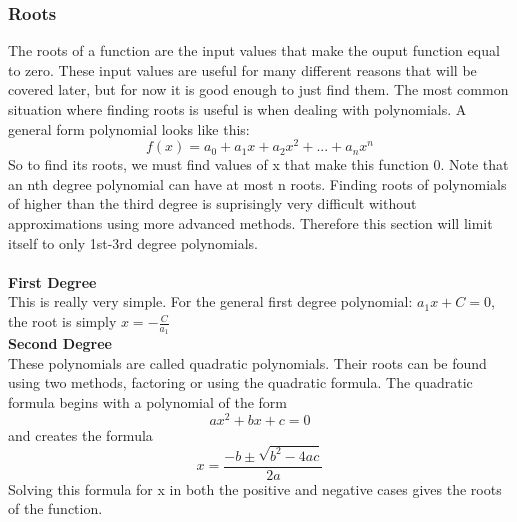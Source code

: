 \documentclass[../Math_Notes.tex]{subfiles}
\begin{document}
\subsubsection{Roots}
The roots of a function are the input values that make the ouput function equal to zero. These input values are useful for many different reasons that will be covered later, but for now it is good enough to just find them. The most common situation where finding roots is useful is when dealing with polynomials. A general form polynomial looks like this:
\[f(x) = a_{0}+a_{1}x+a_{2}x^{2}+...+a_{n}x^{n}\]
So to find its roots, we must find values of x that make this function 0. Note that an nth degree polynomial can have at most n roots. Finding roots of polynomials of higher than the third degree is suprisingly very difficult without approximations using more advanced methods. Therefore this section will limit itself to only 1st-3rd degree polynomials. \\\\
\textbf{First Degree} \\ 
This is really very simple. For the general first degree polynomial:
\(a_{1}x+C=0\), the root is simply
\(x=-\frac{C}{a_{1}}\)\\

\textbf{Second Degree} \\ 
These polynomials are called quadratic polynomials. Their roots can be found using two methods, factoring or using the quadratic formula. The quadratic formula begins with a polynomial of the form
\[ax^{2}+bx+c=0\]
and creates the formula 
\[x=\frac{-b\pm \sqrt{b^{2}-4ac}}{2a}\]
Solving this formula for x in both the positive and negative cases gives the roots of the function.\\
\end{document}
